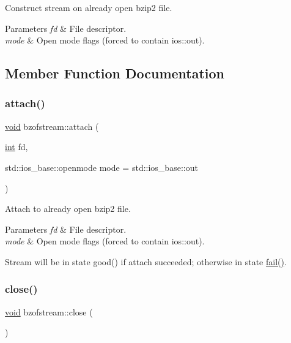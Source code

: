 Construct stream on already open bzip2 file. 


\begin{DoxyParams}{Parameters}
{\em fd} & File descriptor. \\
\hline
{\em mode} & Open mode flags (forced to contain ios\+::out). \\
\hline
\end{DoxyParams}


\subsection{Member Function Documentation}
\mbox{\label{classbzofstream_a3f1f39a5be6fc416c5382d3c5bad05f2}} 
\subsubsection{\texorpdfstring{attach()}{attach()}}
{\footnotesize\ttfamily \hyperlink{lp__lib_8h_ac7828c7b2b31d2e11af17bdb6289c5d9}{void} bzofstream\+::attach (\begin{DoxyParamCaption}\item[{\hyperlink{lp__lib_8h_adeb9ec6400320e4923ac9d836d509ddb}{int}}]{fd,  }\item[{std\+::ios\+\_\+base\+::openmode}]{mode = {\ttfamily std\+:\+:ios\+\_\+base\+:\+:out} }\end{DoxyParamCaption})}



Attach to already open bzip2 file. 


\begin{DoxyParams}{Parameters}
{\em fd} & File descriptor. \\
\hline
{\em mode} & Open mode flags (forced to contain ios\+::out).\\
\hline
\end{DoxyParams}
Stream will be in state good() if attach succeeded; otherwise in state \hyperlink{_constraint_macros_8h_a73a3b169ac8c3419cbe15327e75ffcfd}{fail()}. \mbox{\label{classbzofstream_a7d26c80f20f44614d2635e948757fb1a}} 
\subsubsection{\texorpdfstring{close()}{close()}}
{\footnotesize\ttfamily \hyperlink{lp__lib_8h_ac7828c7b2b31d2e11af17bdb6289c5d9}{void} bzofstream\+::close (\begin{DoxyParamCaption}{ }\end{DoxyParamCaption})}



